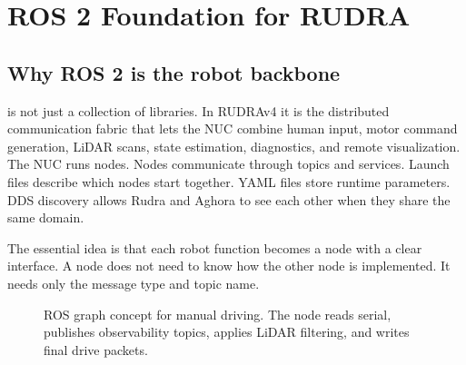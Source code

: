 \chapter{ROS 2 Foundation for RUDRA}

\section{Why ROS 2 is the robot backbone}

\ros{} is not just a collection of libraries. In RUDRAv4 it is the distributed communication fabric that lets the NUC combine human input, motor command generation, LiDAR scans, state estimation, diagnostics, and remote visualization. The NUC runs nodes. Nodes communicate through topics and services. Launch files describe which nodes start together. YAML files store runtime parameters. DDS discovery allows Rudra and Aghora to see each other when they share the same domain.

The essential idea is that each robot function becomes a node with a clear interface. A node does not need to know how the other node is implemented. It needs only the message type and topic name.

\begin{figure}[htbp]
\centering
{}
\caption{ROS graph concept for manual driving. The node reads serial, publishes observability topics, applies LiDAR filtering, and writes final drive packets.}
\end{figure}

